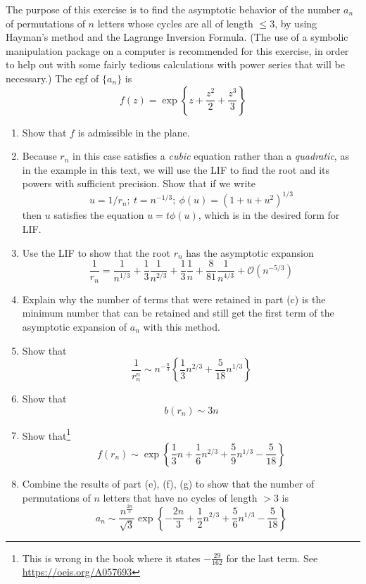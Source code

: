 \begin{exercise}
    The purpose of this exercise is to find the asymptotic behavior of the number $a_n$ of permutations of $n$ letters whose cycles are all of length $\leq 3$, by using Hayman's method and the Lagrange Inversion Formula. (The use of a symbolic manipulation package on a computer is recommended for this exercise, in order to help out with some fairly tedious calculations with power series that will be necessary.) The egf of $\{a_n\}$ is 
    \[
        f(z) = \exp\left\{z+\frac{z^2}{2}+\frac{z^3}{3} \right\}
    \]
    \begin{enumerate}[label=(\alph*)]
        \item Show that $f$ is admissible in the plane.
        \item Because $r_n$ in this case satisfies a \emph{cubic} equation rather than a \emph{quadratic}, as in the example in this text, we will use the LIF to find the root and its powers with sufficient precision. Show that if we write
        \[
            u=1/r_n;\ t=n^{-1/3};\ \phi(u) = (1+u+u^2)^{1/3}
        \]
        then $u$ satisfies the equation $u=t\phi(u)$, which is in the desired form for LIF.
        \item Use the LIF to show that the root $r_n$ has the asymptotic expansion
        \[
            \frac{1}{r_n} = \frac{1}{n^{1/3}} + \frac{1}{3}\frac{1}{n^{2/3}}+\frac{1}{3}\frac{1}{n}+\frac{8}{81}\frac{1}{n^{4/3}}+ \mathcal{O}(n^{-5/3})
        \]
        \item Explain why the number of terms that were retained in part (c) is the minimum number that can be retained and still get the first term of the asymptotic expansion of $a_n$ with this method.
        \item Show that 
        \[
            \frac{1}{r_n^n} \sim n^{-\frac{n}{3}}\left\{\frac{1}{3}n^{2/3}+\frac{5}{18}n^{1/3} \right\}
        \]
        \item Show that 
        \[
            b(r_n) \sim 3n
        \]
        \item Show that\footnote{This is wrong in the book where it states $-\frac{29}{162}$ for the last term. See \url{https://oeis.org/A057693}} 
        \[
            f(r_n) \sim \exp\left\{ \frac{1}{3}n+\frac{1}{6}n^{2/3} +\frac{5}{9}n^{1/3}-\frac{5}{18}\right\}
        \]
        \item Combine the results of part (e), (f), (g) to show that the number of permutations of $n$ letters that have no cycles of length $> 3$ is 
        \[
            a_n \sim \frac{n^{\frac{2n}{3}}}{\sqrt{3}}\exp\left\{-\frac{2n}{3} + \frac{1}{2} n^{2/3}+\frac{5}{6}n^{1/3}-\frac{5}{18}\right\}
        \]
    \end{enumerate}
\end{exercise}
